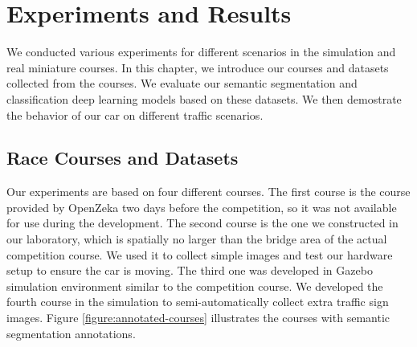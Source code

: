 \chapter{Experiments and Results}
\label{chp:b6}

We conducted various experiments for different scenarios in the simulation and
real miniature courses. In this chapter, we introduce our courses and datasets
collected from the courses. We evaluate our semantic segmentation and
classification deep learning models based on these datasets. We then demostrate
the behavior of our car on different traffic scenarios.

\section{Race Courses and Datasets}

Our experiments are based on four different courses. The first course is the
course provided by OpenZeka  two days before the competition, so it was not
available for use during the development. The second course is the one we
constructed in our laboratory, which is spatially no larger than the bridge
area of the actual competition course. We used it to collect simple images and
test our hardware setup to ensure the car is moving. The third one was
developed in Gazebo simulation environment similar to the competition course.
We developed the fourth course in the simulation to semi-automatically collect
extra traffic sign images. Figure \ref{figure:annotated-courses} illustrates
the courses with semantic segmentation annotations.

